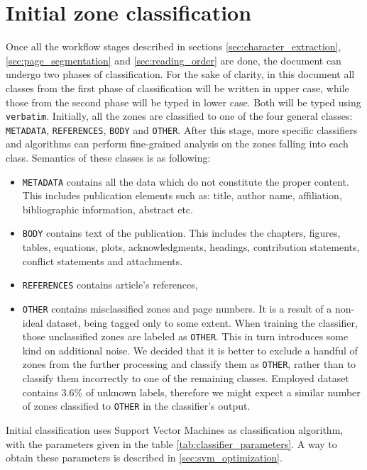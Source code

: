 \section{Initial zone classification}
Once all the workflow stages described in sections \ref{sec:character_extraction}, \ref{sec:page_segmentation} and \ref{sec:reading_order} are done, the document can undergo two phases of classification. For the sake of clarity, in this document all classes from the first phase of classification will be written in upper case, while those from the second phase will be typed in lower case. Both will be typed using \verb+verbatim+.
Initially, all the zones are classified to one of the four general classes: \verb+METADATA+, \verb+REFERENCES+, \verb+BODY+ and \verb+OTHER+. After this stage, more specific classifiers and algorithms can perform fine-grained analysis on the zones falling into each class. Semantics of these classes is as following:
\begin{itemize}
\item \verb+METADATA+ contains all the data which do not constitute the proper content. This includes publication elements such as: title, author name, affiliation, bibliographic information, abstract etc.
\item \verb+BODY+ contains text of the publication. This includes the chapters, figures, tables, equations, plots, acknowledgments, headings, contribution statements, conflict statements and attachments.
\item \verb+REFERENCES+ contains article's references,
\item \verb+OTHER+ contains misclassified zones and page numbers. It is a result of a non-ideal dataset, being tagged only to some extent. When training the classifier, those unclassified zones are labeled as \verb+OTHER+. This in turn introduces some kind on additional noise. We decided that it is better to exclude a handful of zones from the further processing and classify them as \verb+OTHER+, rather than to classify them incorrectly to one of the remaining classes. Employed dataset contains 3.6\% of unknown labels, therefore we might expect a similar number of zones classified to \verb+OTHER+ in the classifier's output.
\end{itemize}
\quad
Initial classification uses Support Vector Machines as classification algorithm, with the parameters given in the table \ref{tab:classifier_parameters}. A way to obtain these parameters is described in \ref{sec:svm_optimization}.

